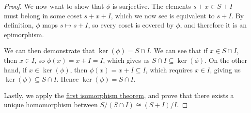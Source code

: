 \begin{proof}
    We now want to show that \(\phi\) is surjective.
    The elements \(s+x \in S+I\) must belong in some coset \(s+x+I\),
    which we now see is equivalent to \(s+I\).
    By definition, \(\phi\) maps \(s \mapsto s+I\),
    so every coset is covered by \(\phi\),
    and therefore it is an epimorphism.

    We can then demonstrate that \(\ker(\phi) = S \cap I\).
    We can see that if \(x \in S \cap I\),
    then \(x \in I\), so \(\phi(x) = x+I = I\),
    which gives us \(S \cap I \subseteq \ker(\phi)\).
    On the other hand, if \(x \in \ker(\phi)\),
    then \(\phi(x) = x+I \subseteq I\),
    which requires \(x \in I\), giving us \(\ker(\phi) \subseteq S \cap I\).
    Hence \(\ker(\phi) = S \cap I\).

    Lastly, we apply the \hyperref[thm:iso-2-ring]{first isomorphism theorem},
    and prove that there exists a unique homomorphism
    between \(S/(S \cap I) \cong (S+I)/I\).
\end{proof}

